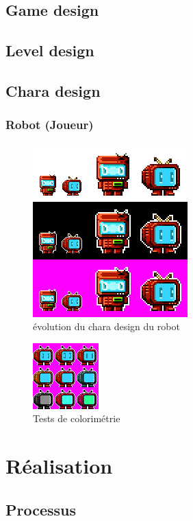 \documentclass{report}
\begin{document}
		\chapter{Game design}
		\chapter{Level design}
		\chapter{Chara design}
			\section{Robot (Joueur)}

\begin{figure}[h!]
	\caption{\label{Evol robot chara design} \'{e}volution du chara design du robot}
	\includegraphics[scale=1]{Chara_design_001.png}
	\centering
\end{figure}

\begin{figure}[h!]
	\caption{\label{Color robot chara design} Tests de colorim\'{e}trie}
	\includegraphics[scale=1]{Chara_design_002.png}
	\centering
\end{figure}

	\part{R\'{e}alisation}
	\setcounter{chapter}{0}
		\chapter{Processus}
\end{document}
